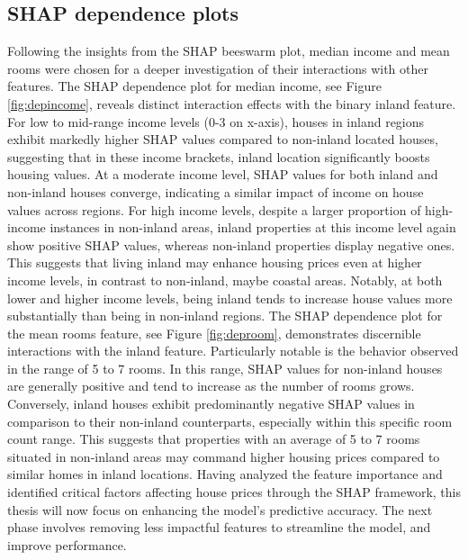 \documentclass[12pt]{article}
\begin{document}
\subsection{SHAP dependence plots}
Following the insights from the SHAP beeswarm plot, median income and mean rooms were chosen for a deeper investigation of their interactions with other features. The SHAP dependence plot for median income, see Figure \ref{fig:depincome}, reveals distinct interaction effects with the binary inland feature.
For low to mid-range income levels (0-3 on x-axis), houses in inland regions exhibit markedly higher SHAP values compared to non-inland located houses, suggesting that in these income brackets, inland location significantly boosts housing values.
At a moderate income level, SHAP values for both inland and non-inland houses converge, indicating a similar impact of income on house values across regions.
For high income levels, despite a larger proportion of high-income instances in non-inland areas, inland properties at this income level again show positive SHAP values, whereas non-inland properties display negative ones. This suggests that living inland may enhance housing prices even at higher income levels, in contrast to non-inland, maybe coastal areas.
Notably, at both lower and higher income levels, being inland tends to increase house values more substantially than being in non-inland regions. 
The SHAP dependence plot for the mean rooms feature, see Figure \ref{fig:deproom}, demonstrates discernible interactions with the inland feature. Particularly notable is the behavior observed in the range of 5 to 7 rooms. In this range, SHAP values for non-inland houses are generally positive and tend to increase as the number of rooms grows. Conversely, inland houses exhibit predominantly negative SHAP values in comparison to their non-inland counterparts, especially within this specific room count range. This suggests that properties with an average of 5 to 7 rooms situated in non-inland areas may command higher housing prices compared to similar homes in inland locations.
Having analyzed the feature importance and identified critical factors affecting house prices through the SHAP framework, this thesis will now focus on enhancing the model's predictive accuracy. The next phase involves removing less impactful features to streamline the model, and improve performance.
\end{document}
